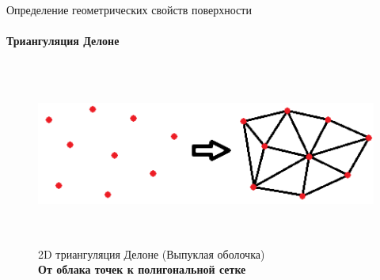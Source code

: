 \documentclass[aspectratio=169,xcolor=table]{beamer}
\begin{document}
\begin{frame}[t]{Определение геометрических свойств поверхности}
    \framesubtitle{Триангуляция Делоне}
    \vspace{-0.2cm}
    \begin{figure}[H]
        \centering\includegraphics[height=6cm,width=1\textwidth,keepaspectratio]{delone_idea.png}
        \caption*{2D триангуляция Делоне (Выпуклая оболочка) \\ \textbf{От облака точек к полигональной сетке}}
        \label{fig:delone_idea.png}
    \end{figure}
\end{frame}
\end{document}
